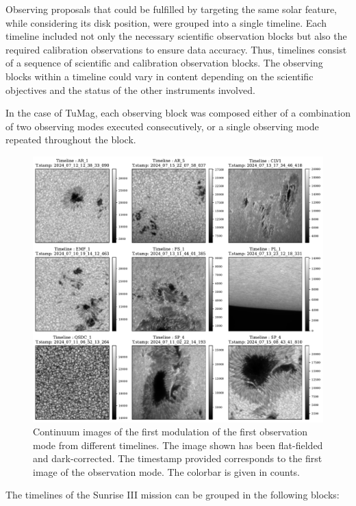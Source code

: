 Observing proposals that could be fulfilled by targeting the same solar feature, while considering its disk position, were grouped into a single timeline. Each timeline included not only the necessary scientific observation blocks but also the required calibration observations to ensure data accuracy. Thus, timelines consist of a sequence of scientific and calibration observation blocks. The observing blocks within a timeline could vary in content depending on the scientific objectives and the status of the other instruments involved.

In the case of TuMag, each observing block was composed either of a combination of two observing modes executed consecutively, or a single observing mode repeated throughout the block.  

\begin{figure}
  \includegraphics[width=\textwidth]{figures/Pipeline/timelines_Examples.pdf}
  \caption[Timelines mosaic.]{
    Continuum images of the first modulation of the first observation mode from different timelines. The image shown has been flat-fielded and dark-corrected. The timestamp provided corresponds to the first image of the observation mode. The colorbar is given in counts.}
    \label{fig_pipeline: timeline_examples}
\end{figure}

The timelines of the Sunrise III mission can be grouped in the following blocks: 

